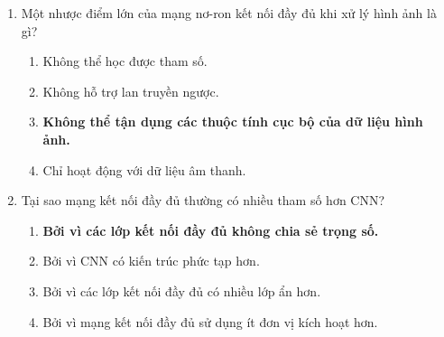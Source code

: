 \documentclass{book}
\begin{document}
\begin{enumerate}
    \item Một nhược điểm lớn của mạng nơ-ron kết nối đầy đủ khi xử lý hình ảnh là gì?
    \begin{multicols}{2}
        \begin{enumerate}[label=\Alph*]
            \item Không thể học được tham số.
            \item Không hỗ trợ lan truyền ngược.
            \item \textbf{Không thể tận dụng các thuộc tính cục bộ của dữ liệu hình ảnh.}
            \item Chỉ hoạt động với dữ liệu âm thanh.
        \end{enumerate}
    \end{multicols}

    \item Tại sao mạng kết nối đầy đủ thường có nhiều tham số hơn CNN?
    \begin{multicols}{2}
        \begin{enumerate}[label=\Alph*]
            \item \textbf{Bởi vì các lớp kết nối đầy đủ không chia sẻ trọng số.}
            \item Bởi vì CNN có kiến trúc phức tạp hơn.
            \item Bởi vì các lớp kết nối đầy đủ có nhiều lớp ẩn hơn.
            \item Bởi vì mạng kết nối đầy đủ sử dụng ít đơn vị kích hoạt hơn.
        \end{enumerate}
    \end{multicols}


\end{enumerate}
\end{document}
